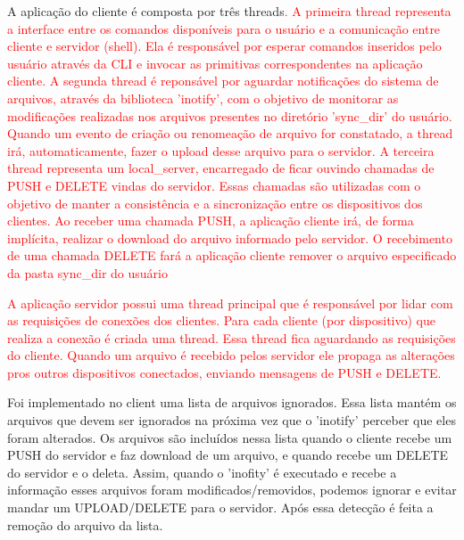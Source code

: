 \documentclass[a4paper]{article}
\begin{document}
A aplicação do cliente é composta por três threads\textcolor{red}{. A primeira thread representa a interface entre os comandos disponíveis para o usuário e a comunicação entre cliente e servidor (shell). Ela é responsável por esperar comandos inseridos pelo usuário através da CLI e invocar as primitivas correspondentes na aplicação cliente. A segunda thread é reponsável por aguardar notificações do sistema de arquivos, através da biblioteca 'inotify', com o objetivo de monitorar as modificações realizadas nos arquivos presentes no diretório 'sync\_dir' do usuário. Quando um evento de criação ou renomeação de arquivo for constatado, a thread irá, automaticamente, fazer o upload desse arquivo para o servidor.} 
\textcolor{red}{A terceira thread representa um local\_server, encarregado de ficar ouvindo chamadas de PUSH e DELETE vindas do servidor. Essas chamadas são utilizadas com o objetivo de manter a consistência e a sincronização entre os dispositivos dos clientes. Ao receber uma chamada PUSH, a aplicação cliente irá, de forma implícita, realizar o download do arquivo informado pelo servidor. O recebimento de uma chamada DELETE fará a aplicação cliente remover o arquivo especificado da pasta sync\_dir do usuário}

\textcolor{red}{A aplicação servidor possui uma thread principal que é responsável por lidar com as requisições de conexões dos clientes. Para cada cliente (por dispositivo) que realiza a conexão é criada uma thread. Essa thread fica aguardando as requisições do cliente. Quando um arquivo é recebido pelos servidor ele propaga as alterações pros outros dispositivos conectados, enviando mensagens de PUSH e DELETE.}

Foi implementado no client uma lista de arquivos ignorados. Essa lista mantém os arquivos que devem ser ignorados na próxima vez que o 'inotify' perceber que eles foram alterados. Os arquivos são incluídos nessa lista quando o cliente recebe um PUSH do servidor e faz download de um arquivo, e quando recebe um DELETE do servidor e o deleta. Assim, quando o 'inofity' é executado e recebe a informação esses arquivos  foram modificados/removidos, podemos ignorar e evitar mandar um UPLOAD/DELETE para o servidor. Após essa detecção é feita a remoção do arquivo da lista.
\end{document}
